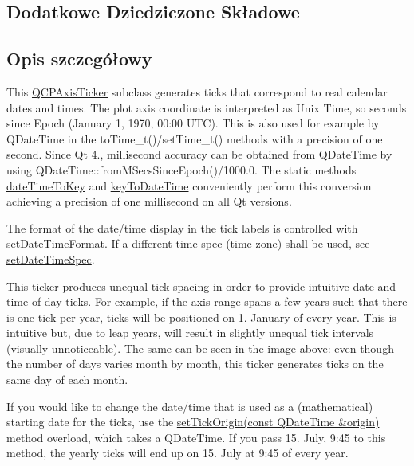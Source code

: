 \subsection*{Dodatkowe Dziedziczone Składowe}


\subsection{Opis szczegółowy}


This \hyperlink{class_q_c_p_axis_ticker}{Q\+C\+P\+Axis\+Ticker} subclass generates ticks that correspond to real calendar dates and times. The plot axis coordinate is interpreted as Unix Time, so seconds since Epoch (January 1, 1970, 00\+:00 U\+TC). This is also used for example by Q\+Date\+Time in the {\ttfamily to\+Time\+\_\+t()/set\+Time\+\_\+t()} methods with a precision of one second. Since Qt 4., millisecond accuracy can be obtained from Q\+Date\+Time by using {\ttfamily Q\+Date\+Time\+::from\+M\+Secs\+Since\+Epoch()/1000.0}. The static methods \hyperlink{class_q_c_p_axis_ticker_date_time_aa24f293f16fff0f937bf71f4140033f1}{date\+Time\+To\+Key} and \hyperlink{class_q_c_p_axis_ticker_date_time_a4c1761ad057f5564804a53f942629b53}{key\+To\+Date\+Time} conveniently perform this conversion achieving a precision of one millisecond on all Qt versions.

The format of the date/time display in the tick labels is controlled with \hyperlink{class_q_c_p_axis_ticker_date_time_ad52660a82f688395468674d555f6a86b}{set\+Date\+Time\+Format}. If a different time spec (time zone) shall be used, see \hyperlink{class_q_c_p_axis_ticker_date_time_afbd987c7197e42ab61e67fb1c38abebc}{set\+Date\+Time\+Spec}.

This ticker produces unequal tick spacing in order to provide intuitive date and time-\/of-\/day ticks. For example, if the axis range spans a few years such that there is one tick per year, ticks will be positioned on 1. January of every year. This is intuitive but, due to leap years, will result in slightly unequal tick intervals (visually unnoticeable). The same can be seen in the image above\+: even though the number of days varies month by month, this ticker generates ticks on the same day of each month.

If you would like to change the date/time that is used as a (mathematical) starting date for the ticks, use the \hyperlink{class_q_c_p_axis_ticker_date_time_a2ea905872b8171847a49a5e093fb0c48}{set\+Tick\+Origin(const Q\+Date\+Time \&origin)} method overload, which takes a Q\+Date\+Time. If you pass 15. July, 9\+:45 to this method, the yearly ticks will end up on 15. July at 9\+:45 of every year.


